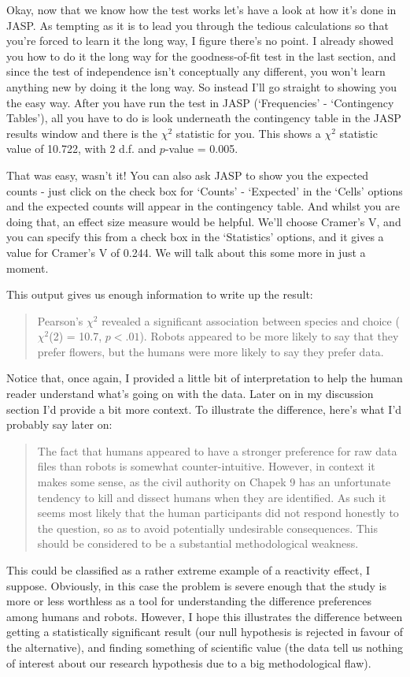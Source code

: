 
Okay, now that we know how the test works let's have a look at how it's done in JASP. As tempting as it is to lead you through the tedious calculations so that you're forced to learn it the long way, I figure there's no point. I already showed you how to do it the long way for the goodness-of-fit test in the last section, and since the test of independence isn't conceptually any different, you won't learn anything new by doing it the long way. So instead I'll go straight to showing you the easy way. After you have run the test in JASP (‘Frequencies’ - ‘Contingency Tables’), all you have to do is look underneath the contingency table in the JASP results window and there is the $\chi^2$ statistic for you. This shows a $\chi^2$ statistic value of 10.722, with 2 d.f. and $p$-value = 0.005. 

That was easy, wasn't it! You can also ask JASP to show you the expected counts - just click on the check box for `Counts' - `Expected' in the `Cells' options and the expected counts will appear in the contingency table. And whilst you are doing that, an effect size measure would be helpful. We'll choose Cramer's V, and you can specify this from a check box in the `Statistics' options, and it gives a value for Cramer's V of 0.244. We will talk about this some more in just a moment.

This output gives us enough information to write up the result:
\begin{quote}
Pearson's $\chi^2$ revealed a significant association between species and choice ($\chi^2$(2) = 10.7, $p < .01$). Robots appeared to be more likely to say that they prefer flowers, but the humans were more likely to say they prefer data.
\end{quote}
Notice that, once again, I provided a little bit of interpretation to help the human reader understand what's going on with the data. Later on in my discussion section I'd provide a bit more context. To illustrate the difference, here's what I'd probably say later on:
\begin{quote}
The fact that humans appeared to have a stronger preference for raw data files than robots is somewhat counter-intuitive. However, in context it makes some sense, as the civil authority on Chapek 9 has an unfortunate tendency to kill and dissect humans when they are identified. As such it seems most likely that the human participants did not respond honestly to the question, so as to avoid potentially undesirable consequences. This should be considered to be a substantial methodological weakness.
\end{quote}
This could be classified as a rather extreme example of a reactivity effect, I suppose. Obviously, in this case the problem is severe enough that the study is more or less worthless as a tool for understanding the difference preferences among humans and robots. However, I hope this illustrates the difference between getting a statistically significant result (our null hypothesis is rejected in favour of the alternative), and finding something of scientific value (the data tell us nothing of interest about our research hypothesis due to a big methodological flaw).


